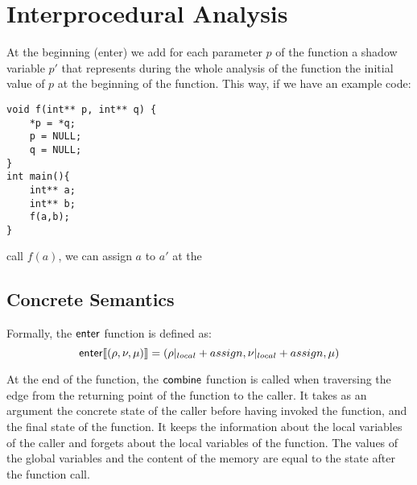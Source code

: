 \section{Interprocedural Analysis}

At the beginning (enter) we add for each parameter $p$ of the function a
shadow variable $p'$ that represents during the whole analysis of the function
the initial value of $p$ at the beginning of the function.
This way, if we have an example code:

\begin{verbatim}
void f(int** p, int** q) {
    *p = *q;
    p = NULL;
    q = NULL;
}
int main(){
    int** a;
    int** b;
    f(a,b);
}
\end{verbatim}

call $f(a)$, we can assign $a$ to $a'$ at the

\subsection{Concrete Semantics}
Formally, the $\textsf{enter}$ function is defined as:
\[
    \textsf{enter} \llbracket(\rho, \nu, \mu)\rrbracket = (\rho|_{local}+assign,\nu|_{local}+assign, \mu)
\]

At the end of the function, the $\textsf{combine}$ function is called when traversing the edge from the returning point of the function to the caller.
It takes as an argument the concrete state of the caller before having invoked the function,
and the final state of the function.
It keeps the information about the local variables of the caller and forgets about the local variables of the function.
The values of the global variables and the content of the memory are equal to the state after the function call.


